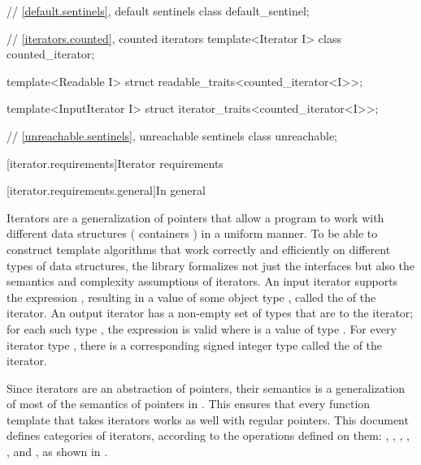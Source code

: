 \begin{addedblock}
\begin{codeblock}
  // \ref{default.sentinels}, default sentinels
  class default_sentinel;

  // \ref{iterators.counted}, counted iterators
  template<Iterator I> class counted_iterator;

  template<Readable I>
    struct readable_traits<counted_iterator<I>>;

  template<InputIterator I>
    struct iterator_traits<counted_iterator<I>>;

  // \ref{unreachable.sentinels}, unreachable sentinels
  class unreachable;
\end{codeblock}\end{addedblock}\begin{codeblock}

  // \ref{stream.iterators}, stream iterators
  [...]
}
\end{codeblock}

[iterator.requirements]{Iterator requirements}

[iterator.requirements.general]{In general}

\pnum
{}%
Iterators are a generalization of pointers that allow a \Cpp{} program
to work with different data structures
( containers ) in a uniform manner.
To be able to construct template algorithms that work correctly and efficiently
on different types of data structures, the library formalizes  not just
the interfaces but also the semantics and complexity assumptions of iterators.
An input iterator
supports the expression
,
resulting in a value of some object type
,
called the
of the iterator.
An output iterator  has a non-empty set of types that are
 to the iterator;
for each such type , the expression 
is valid where  is a value of type .
For every iterator type
, there is a corresponding signed integer type called the
of the iterator.

\pnum
Since iterators are an abstraction of pointers, their semantics is
a generalization of most of the semantics of pointers in \Cpp{}.
This ensures that every
function template
that takes iterators
works as well with regular pointers.
This document defines
 categories of iterators, according to the operations
defined on them:
,
,
,
,
,
and
,
as shown in .

